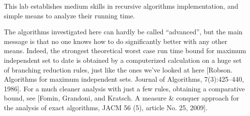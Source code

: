 \documentclass{tufte-handout}
\begin{document}
This lab establishes medium skills in recursive algorithms implementation,
and simple means to analyze their running time.

\bigskip

The algorithms investigated here can hardly be called ``advanced'', but the main message 
is that no one knows how to do significantly better with any other means.
Indeed, the strongest theoretical worst case run time bound for maximum independent set to date
is obtained by a computerized calculation on a huge set of branching reduction rules, just like the ones we've looked at here [Robson. Algorithms for maximum independent sets. Journal of Algorithms, 7(3):425--440, 1986]. For a much cleaner analysis with just a few rules, obtaining a comparative bound, see [Fomin, Grandoni, and Kratsch. A measure \& conquer approach for the analysis of exact algorithms, JACM 56 (5), article No. 25, 2009].
\end{document}

